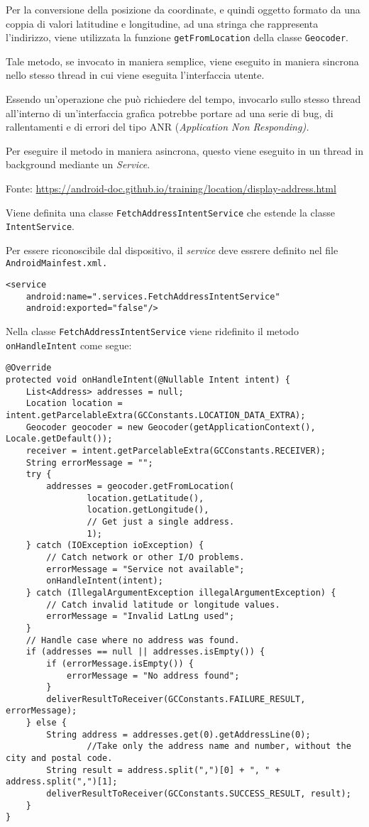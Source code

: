 Per la conversione della posizione da coordinate, e quindi oggetto
formato da una coppia di valori latitudine e longitudine, ad una stringa
che rappresenta l'indirizzo, viene utilizzata la funzione
\texttt{getFromLocation} della classe \texttt{Geocoder}.

Tale metodo, se invocato in maniera semplice, viene eseguito in maniera
sincrona nello stesso thread in cui viene eseguita l'interfaccia utente.

Essendo un'operazione che può richiedere del tempo, invocarlo sullo
stesso thread all'interno di un'interfaccia grafica potrebbe portare ad
una serie di bug, di rallentamenti e di errori del tipo ANR
(\emph{Application Non Responding).}

Per eseguire il metodo in maniera asincrona, questo viene eseguito in un
thread in background mediante un \emph{Service}.

Fonte:
\url{https://android-doc.github.io/training/location/display-address.html}

Viene definita una classe \texttt{FetchAddressIntentService} che estende
la classe \texttt{IntentService}.

Per essere riconoscibile dal dispositivo, il \emph{service} deve essrere
definito nel file \texttt{AndroidMainfest.xml.}

\begin{lstlisting}
<service
    android:name=".services.FetchAddressIntentService"
    android:exported="false"/>
\end{lstlisting}


Nella classe \texttt{FetchAddressIntentService} viene ridefinito il
metodo \texttt{onHandleIntent} come segue:
\begin{lstlisting}
@Override
protected void onHandleIntent(@Nullable Intent intent) {
    List<Address> addresses = null;
    Location location = intent.getParcelableExtra(GCConstants.LOCATION_DATA_EXTRA);
    Geocoder geocoder = new Geocoder(getApplicationContext(), Locale.getDefault());
    receiver = intent.getParcelableExtra(GCConstants.RECEIVER);
    String errorMessage = "";
    try {
        addresses = geocoder.getFromLocation(
                location.getLatitude(),
                location.getLongitude(),
                // Get just a single address.
                1);
    } catch (IOException ioException) {
        // Catch network or other I/O problems.
        errorMessage = "Service not available";
        onHandleIntent(intent);
    } catch (IllegalArgumentException illegalArgumentException) {
        // Catch invalid latitude or longitude values.
        errorMessage = "Invalid LatLng used";
    }
    // Handle case where no address was found.
    if (addresses == null || addresses.isEmpty()) {
        if (errorMessage.isEmpty()) {
            errorMessage = "No address found";
        }
        deliverResultToReceiver(GCConstants.FAILURE_RESULT, errorMessage);
    } else {
        String address = addresses.get(0).getAddressLine(0);
				//Take only the address name and number, without the city and postal code.
        String result = address.split(",")[0] + ", " + address.split(",")[1]; 
        deliverResultToReceiver(GCConstants.SUCCESS_RESULT, result);
    }
}
\end{lstlisting}

